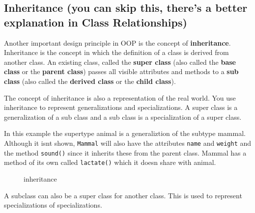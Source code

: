 \subsection{Inheritance (you can skip this, there's a better explanation
in Class
Relationships)}\label{object-oriented-programming-paradigm.md__inheritance-you-can-skip-this-theres-a-better-explanation-in-class-relationships}

Another important design principle in OOP is the concept of
\textbf{inheritance}. Inheritance is the concept in which the definition
of a class is derived from another class. An existing class, called the
\textbf{super class} (also called the \textbf{base class} or the
\textbf{parent class}) passes all visible attributes and methods to a
\textbf{sub class} (also called the \textbf{derived class} or the
\textbf{child class}).

The concept of inheritance is also a representation of the real world.
You use inheritance to represent generalizations and specializations. A
super class is a generalization of a sub class and a sub class is a
specialization of a super class.

In this example the supertype animal is a generaliztion of the subtype
mammal. Although it isnt shown, \texttt{Mammal} will also have the
attributes \texttt{name} and \texttt{weight} and the method
\texttt{sound()} since it inherits these from the parent class. Mammal
has a method of its own called \texttt{lactate()} which it doesn share
with animal.

\begin{figure}
\centering
{}
\caption{inheritance}
\end{figure}

A subclass can also be a super class for another class. This is used to
represent specializations of specializations.

